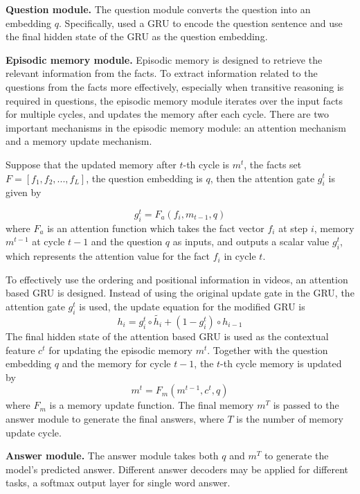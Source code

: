 \documentclass[10pt,twocolumn,letterpaper]{article}
\begin{document}
\textbf{Question module.} The question module converts the question into an embedding $q$. Specifically, \cite{kumar2016ask, xiong2016dynamic}  used a GRU to encode the question sentence and use the final hidden state of the GRU as the question embedding.

\textbf{Episodic memory module.} Episodic memory is designed to retrieve the relevant information from the facts. To extract information related to the questions from the facts more effectively, especially when transitive reasoning is required in questions, the episodic memory module iterates over the input facts for multiple cycles, and updates the memory after each cycle. There are two important mechanisms in the episodic memory module: an attention mechanism and a memory update mechanism. 

Suppose that the updated memory after $t$-th cycle is $m^t$, the facts set $F=[f_1,f_2,...,f_{L}]$, the question embedding is $q$, then the attention gate $g_i^t$ is given by

\begin{equation}
    g_i^t=F_a(f_i,m_{t-1},q) 
\end{equation}    
where $F_a$ is an attention function which takes the fact vector $f_i$ at step $i$, memory $m^{t-1}$ at cycle $t-1$ and the question $q$ as inputs, and outputs a scalar value $g_i^t$, which represents the attention value for the fact $f_i$ in cycle $t$.

To effectively use the ordering and positional information in videos, an attention based GRU is designed. Instead of using the original update gate in the GRU, the attention gate $g_i^t$ is used, the update equation for the modified GRU is 
\begin{equation}
    h_i=g_i^t\circ\tilde{h_i}+(1-g_i^t)\circ h_{i-1}
\end{equation}
The final hidden state of the attention based GRU is used as the contextual feature $c^t$ for updating the episodic memory $m^t$. Together with the question embedding $q$ and the memory for cycle $t-1$, the $t$-th cycle memory is updated by 
\begin{equation}
    m^t=F_m(m^{t-1}, c^t, q)
\end{equation}
where $F_m$ is a memory update function. The final memory $m^T$ is passed to the answer module to generate the final answers, where $T$ is the number of memory update cycle.

\textbf{Answer module.} The answer module takes both $q$ and $m^T$ to generate the model’s predicted answer. Different answer decoders may be applied for different tasks, \eg a softmax output layer for single word answer.
\end{document}
